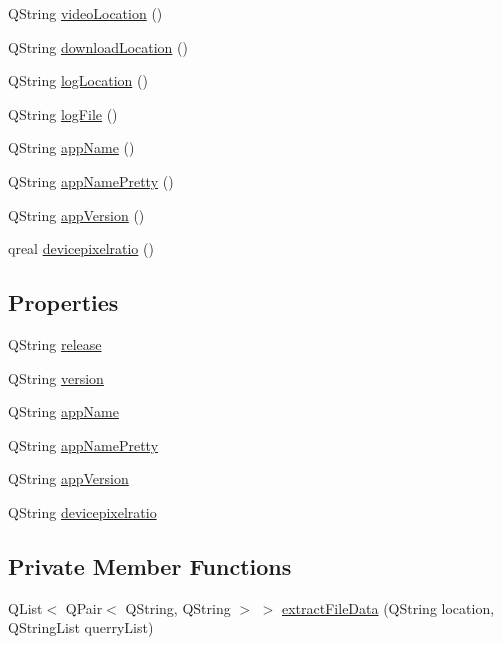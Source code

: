 \begin{DoxyCompactItemize}
\item 
Q\+String \mbox{\hyperlink{classOS_afdfd88fe0b70d4ed51508e7dc364b1d4}{video\+Location}} ()
\item 
Q\+String \mbox{\hyperlink{classOS_a0dac0a86aca0d89d27b9596999506713}{download\+Location}} ()
\item 
Q\+String \mbox{\hyperlink{classOS_a5f0bcd7c973d5875be519ec3a06629f2}{log\+Location}} ()
\item 
Q\+String \mbox{\hyperlink{classOS_a85848812c46025d92b9a061df85d9bce}{log\+File}} ()
\item 
Q\+String \mbox{\hyperlink{classOS_a414805ecb488dd84a111fb2c8c6b9401}{app\+Name}} ()
\item 
Q\+String \mbox{\hyperlink{classOS_af545da4fea44bc32a873f7021498b9fc}{app\+Name\+Pretty}} ()
\item 
Q\+String \mbox{\hyperlink{classOS_ad216acfae668255c7e307e965e5e3a50}{app\+Version}} ()
\item 
qreal \mbox{\hyperlink{classOS_abec33b96eb8c7def86f6f918dc1849c0}{devicepixelratio}} ()
\end{DoxyCompactItemize}
\subsection*{Properties}
\begin{DoxyCompactItemize}
\item 
Q\+String \mbox{\hyperlink{classOS_ac78395d05ca770df0e6136dca18cf682}{release}}
\item 
Q\+String \mbox{\hyperlink{classOS_af9d3ad8c99dd34d874634eae3163dcc3}{version}}
\item 
Q\+String \mbox{\hyperlink{classOS_af9d6295c5361884c9c7c25b13db70720}{app\+Name}}
\item 
Q\+String \mbox{\hyperlink{classOS_a5ecf65ef8f4ac491323d1590c2cb4e67}{app\+Name\+Pretty}}
\item 
Q\+String \mbox{\hyperlink{classOS_a8162949b8a268b409967ae356947e059}{app\+Version}}
\item 
Q\+String \mbox{\hyperlink{classOS_aa40d035f4f4b1f67c6c103cd3b3cfc08}{devicepixelratio}}
\end{DoxyCompactItemize}
\subsection*{Private Member Functions}
\begin{DoxyCompactItemize}
\item 
Q\+List$<$ Q\+Pair$<$ Q\+String, Q\+String $>$ $>$ \mbox{\hyperlink{classOS_a5703fdddfbee21d53e71906d509df442}{extract\+File\+Data}} (Q\+String location, Q\+String\+List querry\+List)
\end{DoxyCompactItemize}
